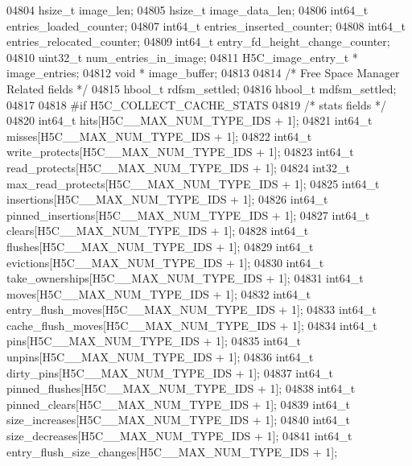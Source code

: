\begin{DoxyCode}
04804     hsize\_t         image\_len;
04805     hsize\_t         image\_data\_len;
04806     int64\_t         entries\_loaded\_counter;
04807     int64\_t         entries\_inserted\_counter;
04808     int64\_t         entries\_relocated\_counter;
04809     int64\_t         entry\_fd\_height\_change\_counter;
04810     uint32\_t            num\_entries\_in\_image;
04811     H5C\_image\_entry\_t *     image\_entries;
04812     \textcolor{keywordtype}{void} *                      image\_buffer;
04813 
04814     \textcolor{comment}{/* Free Space Manager Related fields */}
04815     hbool\_t             rdfsm\_settled;
04816     hbool\_t         mdfsm\_settled;
04817 
04818 \textcolor{preprocessor}{#if H5C\_COLLECT\_CACHE\_STATS}
04819     \textcolor{comment}{/* stats fields */}
04820     int64\_t                     hits[H5C\_\_MAX\_NUM\_TYPE\_IDS + 1];
04821     int64\_t                     misses[H5C\_\_MAX\_NUM\_TYPE\_IDS + 1];
04822     int64\_t                     write\_protects[H5C\_\_MAX\_NUM\_TYPE\_IDS + 1];
04823     int64\_t                     read\_protects[H5C\_\_MAX\_NUM\_TYPE\_IDS + 1];
04824     int32\_t                     max\_read\_protects[H5C\_\_MAX\_NUM\_TYPE\_IDS + 1];
04825     int64\_t                     insertions[H5C\_\_MAX\_NUM\_TYPE\_IDS + 1];
04826     int64\_t                     pinned\_insertions[H5C\_\_MAX\_NUM\_TYPE\_IDS + 1];
04827     int64\_t                     clears[H5C\_\_MAX\_NUM\_TYPE\_IDS + 1];
04828     int64\_t                     flushes[H5C\_\_MAX\_NUM\_TYPE\_IDS + 1];
04829     int64\_t                     evictions[H5C\_\_MAX\_NUM\_TYPE\_IDS + 1];
04830     int64\_t                     take\_ownerships[H5C\_\_MAX\_NUM\_TYPE\_IDS + 1];
04831     int64\_t                     moves[H5C\_\_MAX\_NUM\_TYPE\_IDS + 1];
04832     int64\_t                     entry\_flush\_moves[H5C\_\_MAX\_NUM\_TYPE\_IDS + 1];
04833     int64\_t                     cache\_flush\_moves[H5C\_\_MAX\_NUM\_TYPE\_IDS + 1];
04834     int64\_t                     pins[H5C\_\_MAX\_NUM\_TYPE\_IDS + 1];
04835     int64\_t                     unpins[H5C\_\_MAX\_NUM\_TYPE\_IDS + 1];
04836     int64\_t                     dirty\_pins[H5C\_\_MAX\_NUM\_TYPE\_IDS + 1];
04837     int64\_t                     pinned\_flushes[H5C\_\_MAX\_NUM\_TYPE\_IDS + 1];
04838     int64\_t                     pinned\_clears[H5C\_\_MAX\_NUM\_TYPE\_IDS + 1];
04839     int64\_t                     size\_increases[H5C\_\_MAX\_NUM\_TYPE\_IDS + 1];
04840     int64\_t                     size\_decreases[H5C\_\_MAX\_NUM\_TYPE\_IDS + 1];
04841     int64\_t                     entry\_flush\_size\_changes[H5C\_\_MAX\_NUM\_TYPE\_IDS + 1];

\end{DoxyCode}
